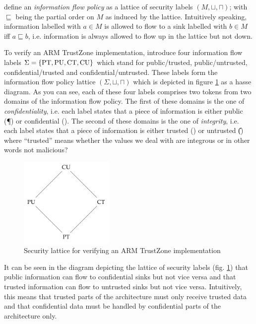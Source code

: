 \citeauthor{Ferraiuolo17} define an \textit{information flow policy} as a lattice of security labels $ (M, \sqcup, \sqcap) $; with $ \sqsubseteq $ being the partial order on $ M $ as induced by the lattice.
Intuitively speaking, information labelled with $ a \in M $ is allowed to flow to a sink labelled with $ b \in M $ iff $ a \sqsubseteq b $, i.e. information is always allowed to flow up in the lattice but not down.

\begin{example}
    To verify an ARM TrustZone implementation, \citeauthor{Ferraiuolo17} introduce four information flow labels $ \Sigma = \{ \text{PT}, \text{PU}, \text{CT}, \text{CU} \} $ which stand for public/trusted, public/untrusted, confidential/trusted and confidential/untrusted.
    These labels form the information flow policy lattice $ (\Sigma, \sqcup, \sqcap) $ which is depicted in figure \ref{fig:sec-lattice} as a hasse diagram.
    As you can see, each of these four labels comprises two tokens from two domains of the information flow policy.
    The first of these domains is the one of \textit{confidentiality}, i.e. each label states that a piece of information is either public (\P{}) or confidential (\C{}).
    The second of these domains is the one of \textit{integrity}, i.e. each label states that a piece of information is either trusted (\T{}) or untrusted (\U{}) where \enquote{trusted} means whether
    the values we deal with are integrous or in other words not malicious?

    \begin{figure}
        \centering
        \includegraphics[width=0.4\textwidth]{figures/ifp-lattice.png}
        \caption{Security lattice for verifying an ARM TrustZone implementation \cite{Ferraiuolo17}}
        \label{fig:sec-lattice}
    \end{figure}

    It can be seen in the diagram depicting the lattice of security labels (fig. \ref{fig:sec-lattice}) that public information can flow to confidential sinks but not vice versa and that trusted information can flow to untrusted sinks but not vice versa.
    Intuitively, this means that trusted parts of the architecture must only receive trusted data and that confidential data must be handled by confidential parts of the architecture only.
\end{example}

